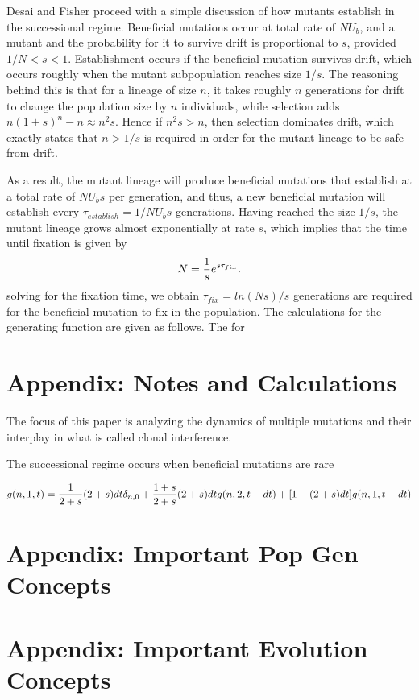 \documentclass[12pt,twocolumn]{article}
\begin{document}
Desai and Fisher proceed with a simple discussion of how mutants establish in the successional regime.  Beneficial mutations occur at total rate of $NU_b$, and a mutant and the probability for it to survive drift is proportional to $s$, provided $1/N<s<1$.  Establishment occurs if the beneficial mutation survives drift, which occurs roughly when the mutant subpopulation reaches size $1/s$.  The reasoning behind this is that for a lineage of size $n$, it takes roughly $n$ generations for drift to change the population size by $n$ individuals, while selection adds $n(1+s)^n-n \approx n^2s$.  Hence if $n^2s>n$, then selection dominates drift, which exactly states that $n>1/s$ is required in order for the mutant lineage to be safe from drift. 

As a result, the mutant lineage will produce beneficial mutations that establish at a total rate of $NU_bs$ per generation, and thus, a new beneficial mutation will establish every $\tau_{establish} = 1/NU_bs$ generations.  Having reached the size $1/s$, the mutant lineage grows almost exponentially at rate $s$, which implies that the time until fixation is given by
\[
N={1 \over s}e^{s \tau_{fix}}.
\]
solving for the fixation time, we obtain $\tau_{fix}=ln(Ns)/s$ generations are required for the beneficial mutation to fix in the population.  
The calculations for the generating function are given as follows. The for

\section{Appendix: Notes and Calculations}
The focus of this paper is analyzing the dynamics of multiple mutations and their interplay in what is called clonal interference.  

The successional regime occurs when beneficial mutations are rare

\begin{align*}
g(n,1,t)={1\over 2+s}(2+s)dt \delta_{n,0} + {1+s\over 2+s}(2+s)dt g(n,2,t-dt)+[1-(2+s)dt] g(n,1,t-dt)
\end{align*}

\section{Appendix: Important Pop Gen Concepts}


\section{Appendix: Important Evolution Concepts}
\end{document}
